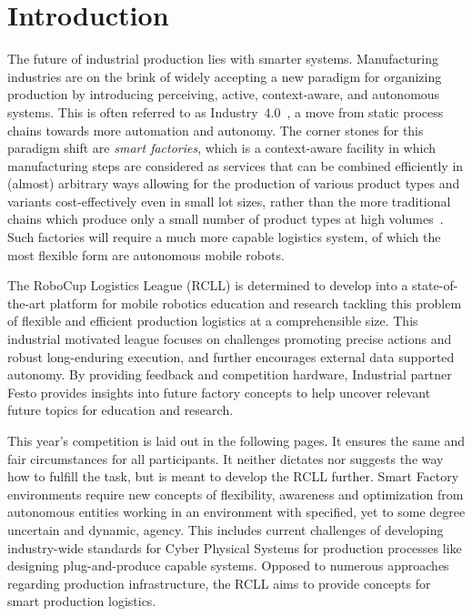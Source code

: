 \documentclass[12pt,twoside]{article}
\begin{document}
\section{Introduction}
\label{sec:intro}
The future of industrial production lies with smarter
systems. Manufacturing industries are on the brink of widely accepting
a new paradigm for organizing production by introducing perceiving,
active, context-aware, and autonomous systems. This is often referred
to as Industry~4.0~\cite{Industry-4.0}, a move from static process
chains towards more automation and autonomy. The corner stones for
this paradigm shift are \emph{smart factories}, which is a
context-aware facility in which manufacturing steps are considered as
services that can be combined efficiently in (almost) arbitrary ways
allowing for the production of various product types and variants
cost-effectively even in small lot sizes, rather than the more
traditional chains which produce only a small number of product types
at high volumes~\cite{RCLL-CPS}. Such factories will require a much
more capable logistics system, of which the most flexible form are
autonomous mobile robots.

The RoboCup Logistics League (RCLL) is determined to develop into a
state-of-the-art platform for mobile robotics education and research
tackling this problem of flexible and efficient production logistics at a
comprehensible size. This industrial motivated league focuses
on challenges promoting precise actions and robust long-enduring
execution, and further encourages external data supported
autonomy. By providing feedback and competition hardware, Industrial
partner Festo provides insights into future factory concepts to help
 uncover relevant future topics for education and research.

 This year's competition is laid out in the following pages.  It ensures
 the same and fair circumstances for all participants. It neither
 dictates nor suggests the way how to fulfill the task, but is meant
 to develop the RCLL further. Smart Factory environments require new
 concepts of flexibility, awareness and optimization from autonomous
 entities working in an environment with specified, yet to some degree
 uncertain and dynamic, agency. This includes current challenges of
 developing industry-wide standards for Cyber Physical Systems for
 production processes like designing plug-and-produce capable
 systems. Opposed to numerous approaches regarding production
 infrastructure, the RCLL aims to provide concepts for smart production
 logistics.
\end{document}
